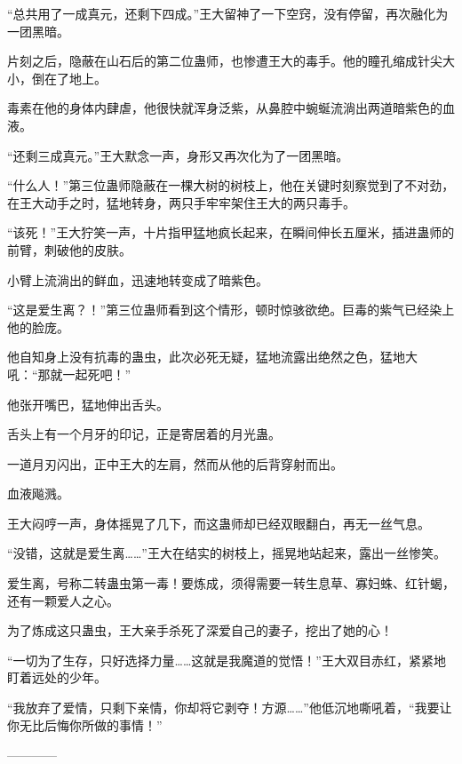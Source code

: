 \begin{this_body}
“总共用了一成真元，还剩下四成。”王大留神了一下空窍，没有停留，再次融化为一团黑暗。

片刻之后，隐蔽在山石后的第二位蛊师，也惨遭王大的毒手。他的瞳孔缩成针尖大小，倒在了地上。

毒素在他的身体内肆虐，他很快就浑身泛紫，从鼻腔中蜿蜒流淌出两道暗紫色的血液。

“还剩三成真元。”王大默念一声，身形又再次化为了一团黑暗。

“什么人！”第三位蛊师隐蔽在一棵大树的树枝上，他在关键时刻察觉到了不对劲，在王大动手之时，猛地转身，两只手牢牢架住王大的两只毒手。

“该死！”王大狞笑一声，十片指甲猛地疯长起来，在瞬间伸长五厘米，插进蛊师的前臂，刺破他的皮肤。

小臂上流淌出的鲜血，迅速地转变成了暗紫色。

“这是爱生离？！”第三位蛊师看到这个情形，顿时惊骇欲绝。巨毒的紫气已经染上他的脸庞。

他自知身上没有抗毒的蛊虫，此次必死无疑，猛地流露出绝然之色，猛地大吼：“那就一起死吧！”

他张开嘴巴，猛地伸出舌头。

舌头上有一个月牙的印记，正是寄居着的月光蛊。

一道月刃闪出，正中王大的左肩，然而从他的后背穿射而出。

血液飚溅。

王大闷哼一声，身体摇晃了几下，而这蛊师却已经双眼翻白，再无一丝气息。

“没错，这就是爱生离……”王大在结实的树枝上，摇晃地站起来，露出一丝惨笑。

爱生离，号称二转蛊虫第一毒！要炼成，须得需要一转生息草、寡妇蛛、红针蝎，还有一颗爱人之心。

为了炼成这只蛊虫，王大亲手杀死了深爱自己的妻子，挖出了她的心！

“一切为了生存，只好选择力量……这就是我魔道的觉悟！”王大双目赤红，紧紧地盯着远处的少年。

“我放弃了爱情，只剩下亲情，你却将它剥夺！方源……”他低沉地嘶吼着，“我要让你无比后悔你所做的事情！”

------------

\end{this_body}

